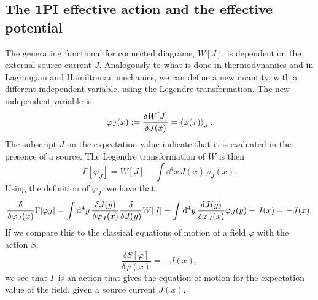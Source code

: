 \subsection{The 1PI effective action and the effective potential}
\label{section: effective action}
The generating functional for connected diagrams, $W[J]$, is dependent on the external source current $J$.
Analogously to what is done in thermodynamics and in Lagrangian and Hamiltonian mechanics, we can define a new quantity, with a different independent variable, using the Legendre transformation.
The new independent variable is 
\begin{equation}
    \varphi_J(x) := \frac{\delta W[J]}{\delta J(x)} = \ex{\varphi(x)}_J.
\end{equation}
The subscript $J$ on the expectation value indicate that it is evaluated in the presence of a source.
The Legendre transformation of $W$ is then
\begin{equation}
    \label{1PI effective action}
    \Gamma[\varphi_J]
    = W[J] - \int \dd^4 x \, J(x) \varphi_J(x).
\end{equation}
Using the definition of $\varphi_J$, we have that
\begin{equation}
    \label{effective equation of motion}
    \fdv{\varphi_J(x)} \Gamma[\varphi_J]
    = \int \dd^4 y \, \fdv{J(y)}{\varphi_J(x)} \fdv{J(y)} W[J]
    - \int \dd^4 y \, \fdv{J(y)}{\varphi_J(x)} \varphi_J(y)
    - J(x)
    = - J(x).
\end{equation}
If we compare this to the classical equations of motion of a field $\varphi$ with the action $S$,
\begin{equation}
    \frac{\delta S[\varphi]}{\delta \varphi(x)} = -J(x),
\end{equation}
we see that $\Gamma$ is an action that gives the equation of motion for the expectation value of the field, given a source current $J(x)$.

